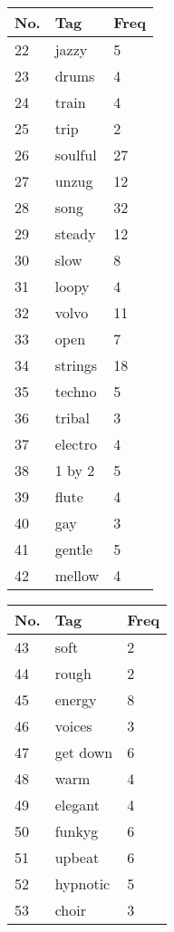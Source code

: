 \begin{appendices}
\begin{tabular}{| p{} | p{} | p{}|}
\hline
\end{tabular}
\quad
\begin{tabular}{| p{} | p{} | p{}|}
\hline
\textbf{No.} & \textbf{Tag} & \textbf{Freq}\\
\hline
22 & jazzy & 5\\
\hline
23 & drums & 4\\
\hline
24 & train & 4\\
\hline
25 & trip & 2\\
\hline
26 & soulful & 27\\
\hline
27 & unzug & 12\\
\hline
28 & song & 32\\
\hline
29 & steady & 12\\
\hline
30 & slow & 8\\
\hline
31 & loopy & 4\\
\hline
32 & volvo & 11\\
\hline
33 & open & 7\\
\hline
34 & strings & 18\\
\hline
35 & techno & 5\\
\hline
36 & tribal & 3\\
\hline
37 & electro & 4\\
\hline
38 & 1 by 2 & 5\\
\hline
39 & flute & 4\\
\hline
40 & gay & 3\\
\hline
41 & gentle & 5\\
\hline
42 & mellow & 4\\
\hline
\end{tabular}
\quad
\begin{tabular}{| p{} | p{} | p{}|}
\hline
\textbf{No.} & \textbf{Tag} & \textbf{Freq}\\
\hline
43 & soft & 2\\
\hline
44 & rough & 2\\
\hline
45 & energy & 8\\
\hline
46 & voices & 3\\
\hline
47 & get down & 6\\
\hline
48 & warm & 4\\
\hline
49 & elegant & 4\\
\hline
50 & funkyg & 6\\
\hline
51 & upbeat & 6\\
\hline
52 & hypnotic & 5\\
\hline 
53 & choir & 3\\

\end{tabular}
\end{appendices}
